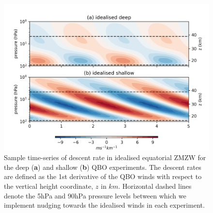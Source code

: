\begin{figure}[h!]
\begin{center}
\noindent\includegraphics[width = 0.8\linewidth]{Figures/Figures-deepQBO/Idealised_QBO_descent_rates.png}
\caption[Idealised QBO descent rates]{Sample time-series of descent rate in idealised equatorial ZMZW for the deep (\textbf{a}) and shallow (\textbf{b}) QBO experiments. The descent rates are defined as the 1st derivative of the QBO winds with respect to the vertical height coordinate, $z$ in $km$. Horizontal dashed lines denote the 5hPa and 90hPa pressure levels between which we implement nudging towards the idealised winds in each experiment.}
\label{fig:Idealised_descent_rates}
\end{center}
\end{figure}

